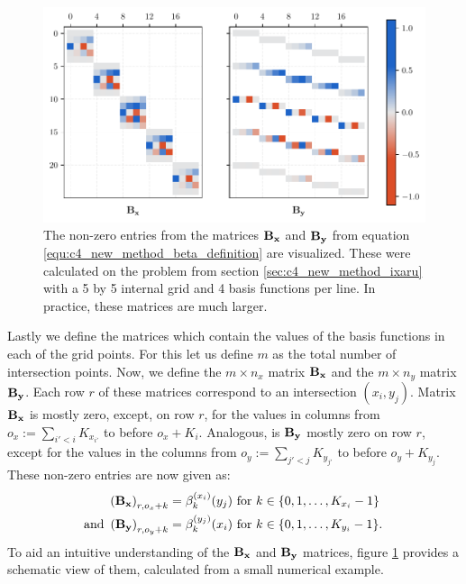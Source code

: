 \begin{figure}
    \begin{center}
        \includegraphics[width=\textwidth]{img/chapter4/new_method_beta.pdf}
        \caption{The non-zero entries from the matrices $\vb{B_x}$ and $\vb{B_y}$ from equation \eqref{equ:c4_new_method_beta_definition} are visualized. These were calculated on the problem from section \ref{sec:c4_new_method_ixaru} with a 5 by 5 internal grid and 4 basis functions per line. In practice, these matrices are much larger.}
        \label{fig:c4_new_method_beta}
    \end{center}
\end{figure}

Lastly we define the matrices which contain the values of the basis functions in each of the grid points. For this let us define $m$ as the total number of intersection points. Now, we define the $m \times n_x$ matrix $\vb{B_x}$ and the $m \times n_y$ matrix $\vb{B_y}$. Each row $r$ of these matrices correspond to an intersection $(x_i, y_j)$. Matrix $\vb{B_x}$ is mostly zero, except, on row $r$, for the values in columns from $o_x := \sum_{i' < i} K_{x_{i'}}$ to before $o_x + K_i$. Analogous, is $\vb{B_y}$ mostly zero on row $r$, except for the values in the columns from $o_y := \sum_{j' < j} K_{y_{j'}}$ to before $o_y + K_{y_j}$. These non-zero entries are now given as:
\begin{align}
    \left(\vb{B_x}\right)_{r, o_x + k} & =  \beta_{k}^{(x_i)}(y_j) \text{ for $k \in \{0, 1, \dots, K_{x_i} - 1\}$ }   \nonumber                               \\
    \text{and }
    \left(\vb{B_y}\right)_{r, o_y + k} & =  \beta_{k}^{(y_j)}(x_i) \text{ for $k \in \{0, 1, \dots, K_{y_i} - 1\}$.} \label{equ:c4_new_method_beta_definition}
\end{align}
To aid an intuitive understanding of the $\vb{B_x}$ and $\vb{B_y}$ matrices, figure \ref{fig:c4_new_method_beta} provides a schematic view of them, calculated from a small numerical example.


